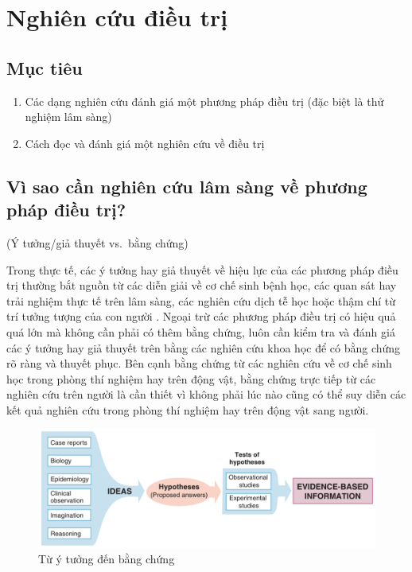 \documentclass[
]{book}
\begin{document}
\hypertarget{dthls_dieutri}{%
\chapter{Nghiên cứu điều trị}\label{dthls_dieutri}}

\hypertarget{mux1ee5c-tiuxeau-1}{%
\section{Mục tiêu}\label{mux1ee5c-tiuxeau-1}}

\begin{enumerate}
\def\labelenumi{\arabic{enumi}.}
\item
  Các dạng nghiên cứu đánh giá một phương pháp điều trị (đặc biệt là thử nghiệm lâm sàng)
\item
  Cách đọc và đánh giá một nghiên cứu về điều trị
\end{enumerate}

\hypertarget{vuxec-sao-cux1ea7n-nghiuxean-cux1ee9u-luxe2m-suxe0ng-vux1ec1-phux1b0ux1a1ng-phuxe1p-ux111iux1ec1u-trux1ecb}{%
\section{Vì sao cần nghiên cứu lâm sàng về phương pháp điều trị?}\label{vuxec-sao-cux1ea7n-nghiuxean-cux1ee9u-luxe2m-suxe0ng-vux1ec1-phux1b0ux1a1ng-phuxe1p-ux111iux1ec1u-trux1ecb}}

(Ý tưởng/giả thuyết vs.~bằng chứng)

Trong thực tế, các ý tưởng hay giả thuyết về hiệu lực của các phương pháp điều trị thường bắt nguồn từ các diễn giải về cơ chế sinh bệnh học, các quan sát hay trải nghiệm thực tế trên lâm sàng, các nghiên cứu dịch tễ học hoặc thậm chí từ trí tưởng tượng của con người \citep{fletcher_clinical_2014}. Ngoại trừ các phương pháp điều trị có hiệu quả quá lớn mà không cần phải có thêm bằng chứng, luôn cần kiểm tra và đánh giá các ý tưởng hay giả thuyết trên bằng các nghiên cứu khoa học để có bằng chứng rõ ràng và thuyết phục. Bên cạnh bằng chứng từ các nghiên cứu về cơ chế sinh học trong phòng thí nghiệm hay trên động vật, bằng chứng trực tiếp từ các nghiên cứu trên người là cần thiết vì không phải lúc nào cũng có thể suy diễn các kết quả nghiên cứu trong phòng thí nghiệm hay trên động vật sang người.

\begin{figure}

{\centering \includegraphics[width=1\linewidth]{figures/dieutri_01} 

}

\caption{Từ ý tưởng đến bằng chứng}\label{fig:unnamed-chunk-2}
\end{figure}
\end{document}
